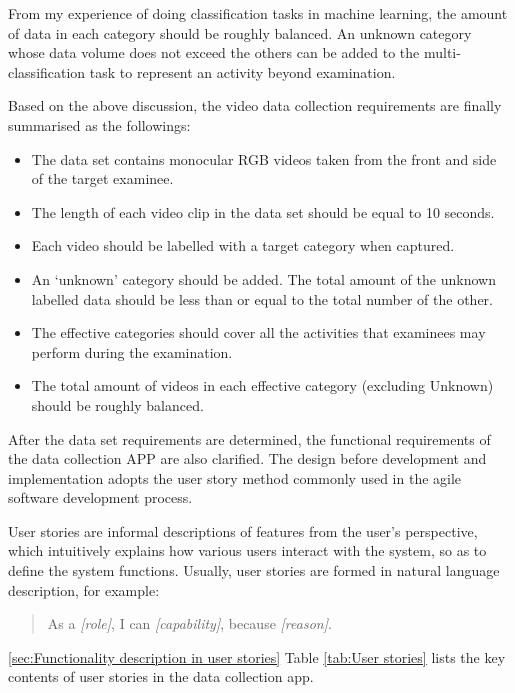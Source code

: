 From my experience of doing classification tasks in machine learning, the amount of data in each category should be roughly balanced.
An unknown category whose data volume does not exceed the others can be added to the multi-classification task to represent an activity beyond examination.

Based on the above discussion, the video data collection requirements are finally summarised as the followings:

\begin{itemize}
    \item The data set contains monocular RGB videos taken from the front and side of the target examinee.
    \item The length of each video clip in the data set should be equal to 10 seconds.
    \item Each video should be labelled with a target category when captured.
    \item An `unknown' category should be added. The total amount of the unknown labelled data should be less than or equal to the total number of the other.
    \item The effective categories should cover all the activities that examinees may perform during the examination.
    \item The total amount of videos in each effective category (excluding Unknown) should be roughly balanced.
\end{itemize}

After the data set requirements are determined, the functional requirements of the data collection APP are also clarified.
The design before development and implementation adopts the user story method commonly used in the agile software development process.

User stories are informal descriptions of features from the user's perspective, which intuitively explains how various users interact with the system, so as to define the system functions.
Usually, user stories are formed in natural language description, for example:
\begin{quote}
    As a \textit{[role]}, I can \textit{[capability]}, because \textit{[reason]}.
\end{quote}
\ref{sec:Functionality description in user stories} Table \ref{tab:User stories} lists the key contents of user stories in the data collection app.
